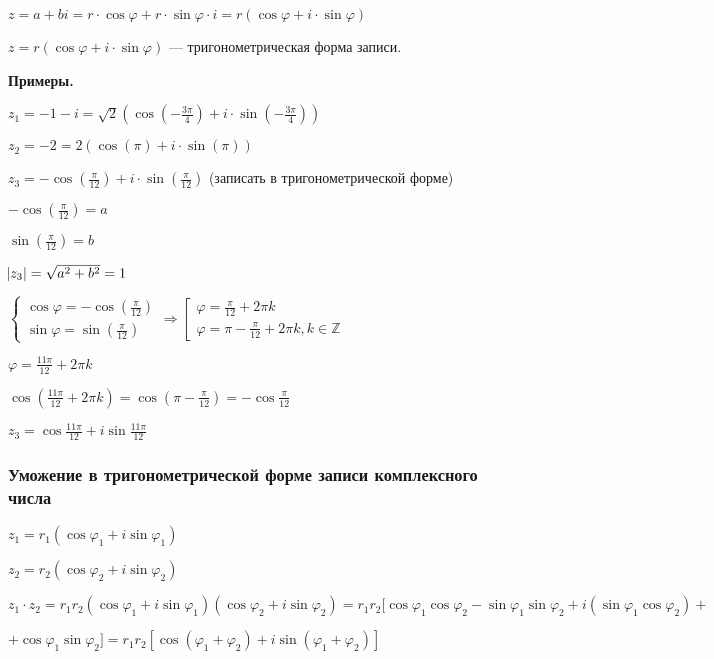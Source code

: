 \documentclass{article}
\begin{document}
    \(z = a + bi = r \cdot \cos \varphi + r \cdot \sin \varphi \cdot i = r(\cos \varphi + i \cdot \sin \varphi)\)
    
    \( z = r(\cos\varphi + i\cdot \sin\varphi) \) --- тригонометрическая форма записи.

    \textbf{Примеры.} %

    \( z_1 = -1 - i = \sqrt{2}(\cos(-\frac{3\pi}{4}) + i\cdot \sin(-\frac{3\pi}{4})) \) 

    \( z_2 = -2 = 2(\cos(\pi) + i\cdot \sin(\pi)) \)

    \( z_3 = -\cos(\frac{\pi}{12}) + i\cdot \sin(\frac{\pi}{12}) \) (записать в тригонометрической форме)

    \( -\cos(\frac{\pi}{12}) = a \)

    \( \sin(\frac{\pi}{12}) = b \)

    \( \abs{z_3} = \sqrt{a^2 + b^2} = 1  \)

    \( \begin{cases}
        \cos\varphi = -\cos(\frac{\pi}{12})\\
        \sin\varphi = \sin(\frac{\pi}{12})
    \end{cases} \Rightarrow \left[ \begin{array}{l} \varphi = \frac{\pi}{12} + 2\pi k\\ \varphi = \pi - \frac{\pi}{12} + 2\pi k, k \in \mathbb{Z}  \end{array} \right. \)

    \(\varphi = \frac{11\pi}{12} + 2\pi k\)

    \(\cos(\frac{11\pi}{12} + 2\pi k) = \cos(\pi - \frac{\pi}{12}) = -\cos\frac{\pi}{12}\)

    \(z_3 = \cos\frac{11\pi}{12} + i\sin\frac{11\pi}{12}\)

    \subsubsection{Уможение в тригонометрической форме записи комплексного числа}

    \(z_1 = r_1(\cos \varphi_1 + i\sin \varphi_1)\)

    \(z_2 = r_2(\cos \varphi_2 + i\sin \varphi_2)\)

    \(z_1 \cdot z_2 = r_1 r_2 (\cos\varphi_1 + i\sin\varphi_1)(\cos\varphi_2 + i\sin\varphi_2) = r_1r_2[\cos\varphi_1\cos\varphi_2 - \sin\varphi_1\sin\varphi_2 + i(\sin\varphi_1\cos\varphi_2) + \)

    \( + \cos\varphi_1\sin\varphi_2] = r_1r_2[\cos(\varphi_1+\varphi_2)+i\sin(\varphi_1 + \varphi_2)]\)
\end{document}
